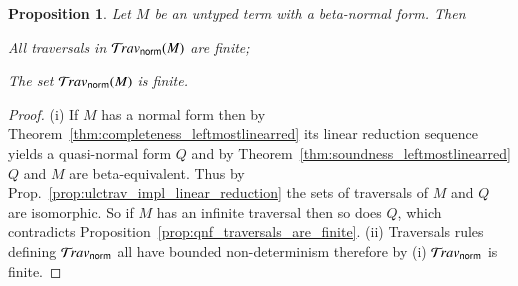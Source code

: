 \documentclass{elsarticle}
\theoremstyle{plain}
\newtheorem{proposition}[theorem]{Proposition}
\theoremstyle{definition}
\theoremstyle{remark}
\newcommand{\normalizing}{{\sf norm}}
\newcommand{\travsetnorm}{\travset_\normalizing}
\begin{document}
\begin{proposition}
\label{prop:ulc_travnorm_finite}
Let $M$ be an untyped term with a beta-normal form. Then
\begin{enumerate*}[label=(\roman*)]
\item All traversals in $\travsetnorm(M)$ are finite;
\item The set $\travsetnorm(M)$ is finite.
\end{enumerate*}
\end{proposition}
\begin{proof}
(i) If $M$ has a normal form then by Theorem~\ref{thm:completeness_leftmostlinearred} its linear reduction sequence yields a quasi-normal form $Q$ and by Theorem~\ref{thm:soundness_leftmostlinearred} $Q$ and $M$ are beta-equivalent. Thus by Prop.~\ref{prop:ulctrav_impl_linear_reduction} the sets of traversals of $M$ and $Q$ are isomorphic. So if $M$ has an infinite traversal then so does $Q$, which contradicts Proposition~\ref{prop:qnf_traversals_are_finite}.
(ii) Traversals rules defining $\travsetnorm$ all have bounded non-determinism therefore by (i) $\travsetnorm$ is finite.
\end{proof}

\end{document}
